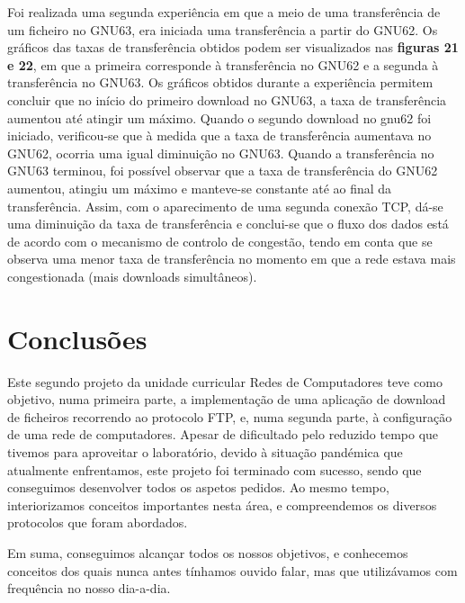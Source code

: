 \documentclass[article, a4paper, 11pt, oneside]{memoir}
\begin{document}
Foi realizada uma segunda experiência em que a meio de uma transferência de um ficheiro no GNU63, 
era iniciada uma transferência a partir do GNU62. Os gráficos das taxas de transferência
obtidos podem ser visualizados nas \textbf{figuras 21 e 22}, em que a primeira corresponde à transferência no GNU62 e a segunda à transferência no GNU63.
Os gráficos obtidos durante a experiência permitem concluir que no início do primeiro download no GNU63, a taxa de transferência aumentou até atingir um máximo. 
Quando o segundo download no gnu62 foi iniciado, verificou-se que à medida que a taxa de transferência aumentava no GNU62, ocorria uma igual diminuição no GNU63. 
Quando a transferência no GNU63
terminou, foi possível observar que a taxa de transferência do GNU62 aumentou, atingiu um máximo e manteve-se constante até ao final da transferência.
Assim, com o aparecimento de uma segunda conexão TCP, dá-se uma diminuição da taxa de transferência e conclui-se que o fluxo dos dados está de acordo 
com o mecanismo de controlo de congestão, tendo em conta que se observa uma menor taxa de transferência no momento em que a rede estava mais congestionada 
(mais downloads simultâneos).



\chapter[Conclusões][Conclusões]{Conclusões} \label{\thechapter}

Este segundo projeto da unidade curricular Redes de Computadores teve como objetivo, numa primeira parte, a implementação de uma aplicação de download de ficheiros recorrendo ao protocolo FTP,
e, numa segunda parte, à configuração de uma rede de computadores. Apesar de dificultado pelo reduzido tempo que tivemos para aproveitar o laboratório, devido à situação pandémica que atualmente enfrentamos,
este projeto foi terminado com sucesso, sendo que conseguimos desenvolver todos os aspetos pedidos.
Ao mesmo tempo, interiorizamos conceitos importantes nesta área, e compreendemos os diversos protocolos que foram abordados.

Em suma, conseguimos alcançar todos os nossos objetivos, e conhecemos conceitos dos quais nunca antes tínhamos ouvido falar, mas que utilizávamos com frequência no nosso dia-a-dia.
\end{document}
